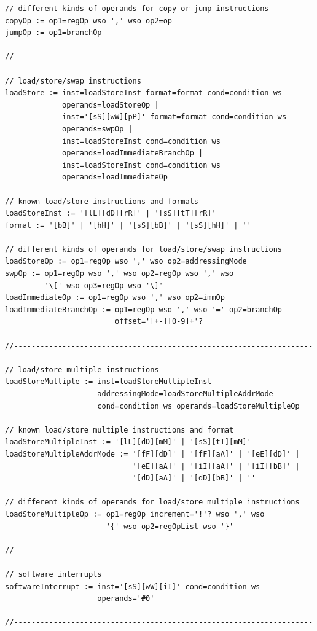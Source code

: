 \documentclass[a4paper, 11pt, onecolumn]{article}
\begin{document}
\begin{lstlisting}[basicstyle=\ttfamily\footnotesize, caption={[Vollständige Grammatik]}]
// different kinds of operands for copy or jump instructions
copyOp := op1=regOp wso ',' wso op2=op
jumpOp := op1=branchOp

//--------------------------------------------------------------------

// load/store/swap instructions
loadStore := inst=loadStoreInst format=format cond=condition ws
             operands=loadStoreOp |
             inst='[sS][wW][pP]' format=format cond=condition ws
             operands=swpOp |
             inst=loadStoreInst cond=condition ws
             operands=loadImmediateBranchOp |
             inst=loadStoreInst cond=condition ws
             operands=loadImmediateOp

// known load/store instructions and formats
loadStoreInst := '[lL][dD][rR]' | '[sS][tT][rR]'
format := '[bB]' | '[hH]' | '[sS][bB]' | '[sS][hH]' | ''

// different kinds of operands for load/store/swap instructions
loadStoreOp := op1=regOp wso ',' wso op2=addressingMode
swpOp := op1=regOp wso ',' wso op2=regOp wso ',' wso
         '\[' wso op3=regOp wso '\]'
loadImmediateOp := op1=regOp wso ',' wso op2=immOp
loadImmediateBranchOp := op1=regOp wso ',' wso '=' op2=branchOp
                         offset='[+-][0-9]+'?

//--------------------------------------------------------------------

// load/store multiple instructions
loadStoreMultiple := inst=loadStoreMultipleInst
                     addressingMode=loadStoreMultipleAddrMode
                     cond=condition ws operands=loadStoreMultipleOp

// known load/store multiple instructions and format
loadStoreMultipleInst := '[lL][dD][mM]' | '[sS][tT][mM]'
loadStoreMultipleAddrMode := '[fF][dD]' | '[fF][aA]' | '[eE][dD]' |
                             '[eE][aA]' | '[iI][aA]' | '[iI][bB]' |
                             '[dD][aA]' | '[dD][bB]' | ''

// different kinds of operands for load/store multiple instructions
loadStoreMultipleOp := op1=regOp increment='!'? wso ',' wso
                       '{' wso op2=regOpList wso '}'

//--------------------------------------------------------------------

// software interrupts
softwareInterrupt := inst='[sS][wW][iI]' cond=condition ws
                     operands='#0'

//--------------------------------------------------------------------


\end{lstlisting}
\end{document}
